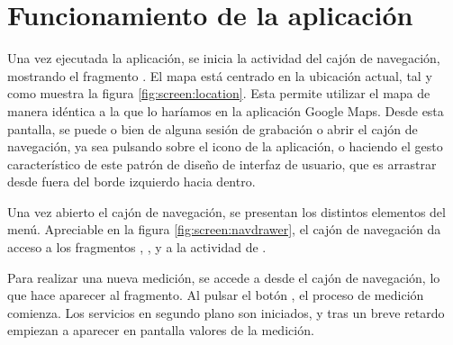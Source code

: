 \label{chp:App}
\section{Funcionamiento de la aplicación}
    Una vez ejecutada la aplicación, se inicia la actividad del cajón de navegación, mostrando el fragmento . El mapa está centrado en la ubicación actual, tal y como muestra la figura \ref{fig:screen:location}. Esta permite utilizar el mapa de manera idéntica a la que lo haríamos en la aplicación Google Maps. Desde esta pantalla, se puede o bien  de alguna sesión de grabación o abrir el cajón de navegación, ya sea pulsando sobre el icono de la aplicación, o haciendo el gesto característico de este patrón de diseño de interfaz de usuario, que es arrastrar desde fuera del borde izquierdo hacia dentro.
    
    Una vez abierto el cajón de navegación, se presentan los distintos elementos del menú. Apreciable en la figura \ref{fig:screen:navdrawer}, el cajón de navegación da acceso a los fragmentos , ,  y a la actividad de .
    
    Para realizar una nueva medición, se accede a  desde el cajón de navegación, lo que hace aparecer al fragmento. Al pulsar el botón , el proceso de medición comienza. Los servicios en segundo plano son iniciados, y tras un breve retardo empiezan a aparecer en pantalla valores de la medición. 
    
